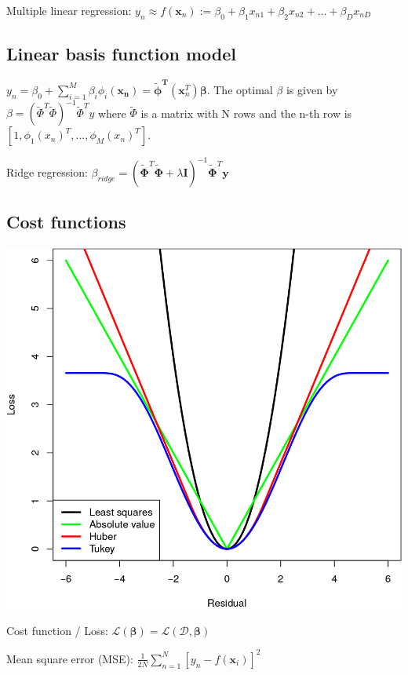 \documentclass[10pt,a4paper,landscape]{article}
\providecommand{\bf}[1]{\ensuremath{\mathbf{#1}}}
\newcommand{\bbeta}{\boldsymbol\beta}
\begin{document}
\begin{multicols*}{4}
Multiple linear regression: $y_n \approx f(\bf{x}_n) := \beta_0 + \beta_1 x_{n1} + \beta_2 x_{n2} + ... + \beta_D x_{nD}$

\subsection{Linear basis function model}
$y_n = \beta_0 + \sum_{i=1}^{M} \beta_i \phi_i(\bf{x_n}) =  \bf{\tilde\phi^T}(\bf{x}^T_n) \bbeta$.
The optimal $\beta$ is given by $\beta = ( \tilde{\Phi}^T \tilde{\Phi})^{-1} \tilde{\Phi}^T y$ where $\tilde{\Phi}$ is a matrix with N rows and the n-th row is $[1, \phi_1(x_n)^T,  ...,  \phi_M(x_n)^T]$.

Ridge regression: $\beta_{ridge} = ( \tilde{\boldsymbol\Phi}^T \tilde{\boldsymbol\Phi} + \lambda \boldsymbol I)^{-1} \tilde{\boldsymbol\Phi}^T \boldsymbol y$

\subsection{Cost functions}
\begin{colfig}
\centering
\includegraphics[width=\linewidth]{images/error-functions.png}
\end{colfig}

Cost function / Loss: $\mathcal{L}(\bbeta) = \mathcal{L}(\mathcal{D},\bbeta)$

Mean square error (MSE): $\frac{1}{2N} \sum_{n=1}^{N}\left[y_n-f(\bf{x}_i) \right]^2$


\end{multicols*}
\end{document}
